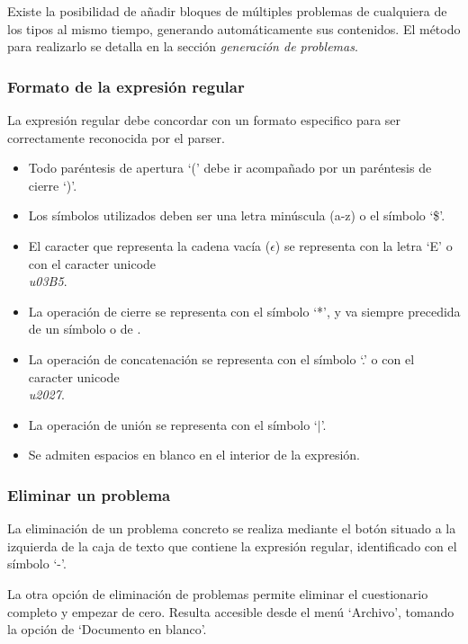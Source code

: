 
Existe la posibilidad de añadir bloques de múltiples problemas de cualquiera de los tipos al mismo tiempo, generando automáticamente sus contenidos.
El método para realizarlo se detalla en la sección \emph{generación de problemas}.

\subsubsection{Formato de la expresión regular}
La expresión regular debe concordar con un formato especifico para ser correctamente reconocida por el parser.
\begin{itemize}
	\item Todo paréntesis de apertura `(' debe ir acompañado por un paréntesis de cierre `)'.
	\item Los símbolos utilizados deben ser una letra minúscula (a-z) o el símbolo `\$'.
	\item El caracter que representa la cadena vacía ($ \epsilon $) se representa con la letra `E' o con el caracter unicode \emph{\\u03B5}.
	\item La operación de cierre se representa con el símbolo `*', y va siempre precedida de un símbolo o de \epsilon.
	\item La operación de concatenación se representa con el símbolo `.' o con el caracter unicode \emph{\\u2027}.
	\item La operación de unión se representa con el símbolo `$ | $'.
	\item Se admiten espacios en blanco en el interior de la expresión.
\end{itemize}

\subsubsection{Eliminar un problema}
La eliminación de un problema concreto se realiza mediante el botón situado a la izquierda de la caja de texto que contiene la expresión regular, identificado con el símbolo `-'.


La otra opción de eliminación de problemas permite eliminar el cuestionario completo y empezar de cero.
Resulta accesible desde el menú `Archivo', tomando la opción de `Documento en blanco'.

